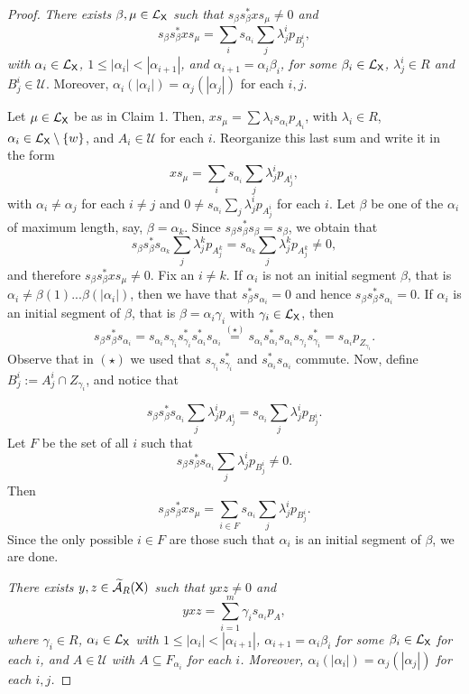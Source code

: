 \documentclass[a4paper,12pt]{amsart}
\theoremstyle{definition}
\theoremstyle{remark}
\numberwithin{equation}{section}
\newcommand{\osf}{{\normalfont \textsf{X}}}
\newcommand{\lang}{\CL_{\osf}}
\newcommand{\ualgshift}{\TCA_R(\osf)}
\newcommand{\CA}{\mathcal{A}}
\newcommand{\CL}{\mathcal{L}}
\newcommand{\TCA}{\widetilde{\CA}}
\newcommand{\TCB}{\mathcal{U}}
\begin{document}
\begin{proof}
\smallskip
{} {\it There exists $\beta,\mu \in \lang$ such that $s_\beta s_\beta^* x s_\mu\neq 0$ and 
$$s_\beta s_\beta^*xs_\mu=\sum\limits_i s_{\alpha_i}\sum\limits_j \lambda_j^ip_{B_j^i},$$ with $\alpha_i\in \lang$, $1\leq|\alpha_i|<|\alpha_{i+1}|$, and $\alpha_{i+1}=\alpha_i\beta_i$, for some $\beta_i\in \lang$, $\lambda_j^i\in R$ and $B_j^i\in \TCB$}. Moreover, $\alpha_i(|\alpha_i|)=\alpha_j(|\alpha_j|)$ for each $i, j$.
\smallskip

Let $\mu\in \lang$ be as in Claim 1. Then, $xs_\mu=\sum\limits\lambda_i s_{\alpha_i}p_{A_i}$,  with $\lambda_i\in R$, $\alpha_i\in \lang\setminus \{w\}$, and $A_i\in \TCB$ for each $i$. Reorganize this last sum and write it in the form   
$$xs_\mu=\sum\limits_i s_{\alpha_i}\sum\limits_j \lambda_j^ip_{A_j^i},$$ with $\alpha_i\neq \alpha_j$ for each $i\neq j$ and $0\neq s_{\alpha_i}\sum\limits_j \lambda_j^ip_{A_j^i}$ for each $i$.
 Let $\beta$ be one of the $\alpha_i$ of maximum length, say, $\beta=\alpha_k$. Since $s_\beta s_\beta^*s_\beta=s_\beta$, we obtain that $$s_\beta s_\beta^*s_{\alpha_k}\sum\limits_j \lambda_j^kp_{A_j^k}=s_{\alpha_k}\sum\limits_j \lambda_j^kp_{A_j^k} \neq 0,$$ and therefore $s_\beta s_\beta^*xs_\mu\neq 0$. 
 Fix an $i\neq k$. If $\alpha_i$ is not an initial segment $\beta$, that is  $\alpha_i\neq \beta(1)...\beta(|\alpha_i|)$, then we have that $s_\beta^*s_{\alpha_i}=0$ and hence $s_\beta s_\beta^* s_{\alpha_i}=0$. If $\alpha_i$ is an initial segment of $\beta$, that is $\beta=\alpha_i\gamma_i$ with $\gamma_i\in \lang$, then $$s_\beta s_\beta^*s_{\alpha_i}=s_{\alpha_i}s_{\gamma_i} s_{\gamma_i}^*s_{\alpha_i}^*s_{\alpha_i}\stackrel{(\star)}{=}s_{\alpha_i}s_{\alpha_i}^*s_{\alpha_i}s_{\gamma_i} s_{\gamma_i}^*=s_{\alpha_i} p_{Z_{\gamma_i}}.$$
Observe that in $(\star)$ we used that $s_{\gamma_i} s_{\gamma_i}^*$ and $s_{\alpha_i}^*s_{\alpha_i}$ commute.
Now, define $B_j^i:=A_j^i\cap Z_{\gamma_i}$, and notice that 
 
 $$s_\beta s_\beta^* s_{\alpha_i}\sum\limits_j \lambda_j^i p_{A_j^i}=s_{\alpha_i} \sum\limits_j \lambda_j^i p_{B_j^i}.$$
Let $F$ be the set of all $i$ such that $$s_\beta s_\beta^* s_{\alpha_i}\sum\limits_j \lambda_j^ip_{B_j^i}\neq 0.$$ 
Then  $$s_\beta s_\beta^*xs_\mu=\sum\limits_{i\in F} s_{\alpha_i}\sum\limits_j \lambda_j^ip_{B_j^i}.$$
Since the only possible $i\in F$ are those such that $\alpha_i$ is an initial segment of $\beta$, we are done.

\smallskip
{} {\it There exists $y,z\in \ualgshift$ such that $yxz\neq 0$ and 
$$yxz=\sum\limits_{i=1}^m\gamma_i s_{\alpha_i}p_A,$$ where $\gamma_i \in R$, $\alpha_i \in \lang$ with $1\leq |\alpha_i|<|\alpha_{i+1}|$,  $\alpha_{i+1}=\alpha_i\beta_i$ for some $\beta_i\in \lang$ for each $i$, and $A\in \TCB$ with $A\subseteq F_{\alpha_i}$ for each $i$. Moreover, $\alpha_i(|\alpha_i|)=\alpha_j(|\alpha_j|)$ for each $i, j$.}
\smallskip


\end{proof}
\end{document}
